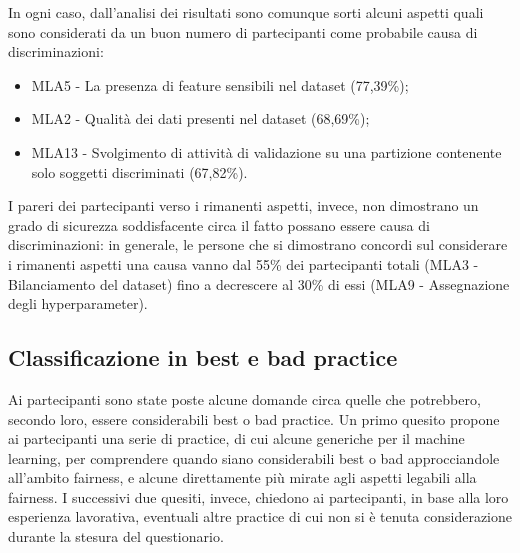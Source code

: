 In ogni caso, dall'analisi dei risultati sono comunque sorti alcuni aspetti quali sono considerati da un buon numero di partecipanti come probabile causa di discriminazioni:
\begin{itemize}
    \item MLA5 - La presenza di feature sensibili nel dataset (77,39\%);
    \item MLA2 - Qualità dei dati presenti nel dataset (68,69\%);
    \item MLA13 - Svolgimento di attività di validazione su una partizione contenente solo soggetti discriminati (67,82\%).
\end{itemize}
I pareri dei partecipanti verso i rimanenti aspetti, invece, non dimostrano un grado di sicurezza soddisfacente circa il fatto possano essere causa di discriminazioni: in generale, le persone che si dimostrano concordi sul considerare i rimanenti aspetti una causa vanno dal 55\% dei partecipanti totali (MLA3 - Bilanciamento del dataset) fino a decrescere al 30\% di essi (MLA9 - Assegnazione degli hyperparameter).

\subsection{Classificazione in best e bad practice}
Ai partecipanti sono state poste alcune domande circa quelle che potrebbero, secondo loro, essere considerabili best o bad practice. Un primo quesito propone ai partecipanti una serie di practice, di cui alcune generiche per il machine learning, per comprendere quando siano considerabili best o bad approcciandole all'ambito fairness, e alcune direttamente più mirate agli aspetti legabili alla fairness. I successivi due quesiti, invece, chiedono ai partecipanti, in base alla loro esperienza lavorativa, eventuali altre practice di cui non si è tenuta considerazione durante la stesura del questionario.\\

